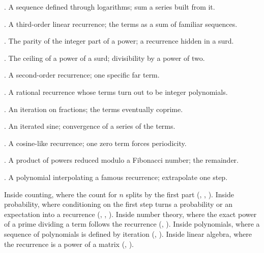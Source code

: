 \begin{ladder}
\item {}. A sequence defined through logarithms; sum a series built from it.
\item {}. A third-order linear recurrence; the terms as a sum of familiar sequences.
\item {}. The parity of the integer part of a power; a recurrence hidden in a surd.
\item {}. The ceiling of a power of a surd; divisibility by a power of two.
\item {}. A second-order recurrence; one specific far term.
\item {}. A rational recurrence whose terms turn out to be integer polynomials.
\item {}. An iteration on fractions; the terms eventually coprime.
\item {}. An iterated sine; convergence of a series of the terms.
\item {}. A cosine-like recurrence; one zero term forces periodicity.
\item {}. A product of powers reduced modulo a Fibonacci number; the remainder.
\item {}. A polynomial interpolating a famous recurrence; extrapolate one step.
\end{ladder}

\begin{hides}
Inside counting, where the count for $n$ splits by the first part (, , ). Inside probability, where conditioning on the first step turns a probability or an expectation into a recurrence (, , ). Inside number theory, where the exact power of a prime dividing a term follows the recurrence (, ). Inside polynomials, where a sequence of polynomials is defined by iteration (, ). Inside linear algebra, where the recurrence is a power of a matrix (, ).
\end{hides}
